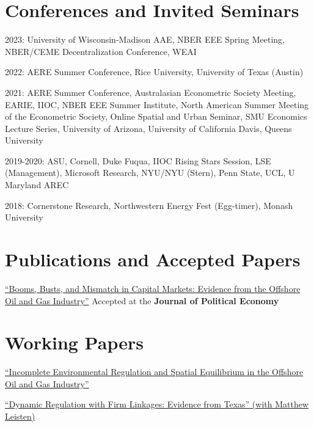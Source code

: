 \documentclass[margin,line]{res}
\newenvironment{list1}{
  \begin{list}{\ding{113}}{%
      \setlength{\itemsep}{.025in}
      \setlength{\parsep}{0in} \setlength{\parskip}{0in}
      \setlength{\topsep}{0in} \setlength{\partopsep}{0in}
      \setlength{\leftmargin}{0.17in}}}{\end{list}}
\begin{document}
\begin{resume}
\section{ Conferences and Invited Seminars}
\begin{list1}
\item[] 2023: University of Wisconsin-Madison AAE, NBER EEE Spring Meeting, NBER/CEME Decentralization Conference, WEAI
\item[] 2022: AERE Summer Conference, Rice University, University of Texas (Austin)
\item[] 2021: AERE Summer Conference, Australasian Econometric Society Meeting, EARIE, IIOC, NBER EEE Summer Institute, North American Summer Meeting of the Econometric Society, Online Spatial and Urban Seminar, SMU Economics Lecture Series, University of Arizona, University of California Davis, Queens University
\item[] 2019-2020: ASU, Cornell, Duke Fuqua, IIOC Rising Stars Session, LSE (Management), Microsoft Research, NYU/NYU (Stern), Penn State, UCL, U Maryland AREC
\item[] 2018:  Cornerstone Research, Northwestern Energy Fest (Egg-timer), Monash University
\end{list1}

\section{Publications and Accepted Papers}
\begin{list1}
\item[] \href{https://nvreug.github.io/paper/bbm.pdf}{``Booms, Busts, and Mismatch in Capital Markets: Evidence from the Offshore Oil and Gas Industry''} Accepted at the \textbf{Journal of Political Economy}
\end{list1}

\section{Working Papers}
\begin{list1}

\item[] \href{https://nvreug.github.io/paper/oil_incomplete.pdf}{``Incomplete Environmental Regulation and Spatial Equilibrium in the Offshore Oil and Gas Industry''}

\item[] \href{ https://www.dropbox.com/s/ceqvc55q4hxpi4b/Dynamic_Regulation_with_Firm_Linkages.pdf?dl=0}{``Dynamic Regulation with Firm Linkages: Evidence from Texas'' (with Matthew Leisten)}
\end{list1}


\end{resume}
\end{document}
